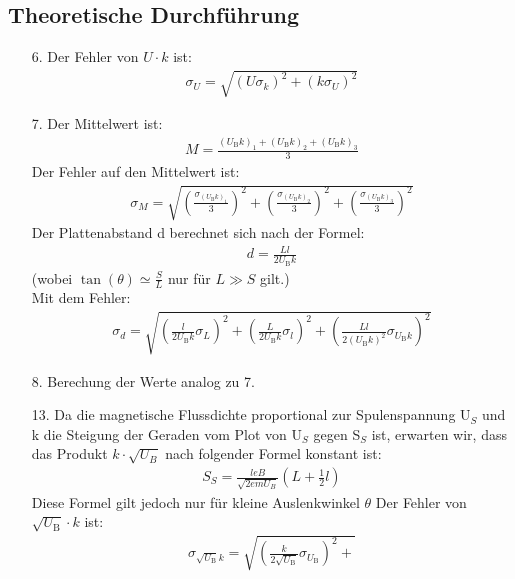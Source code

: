 \documentclass[12pt]{scrartcl}
\begin{document}
\subsection{Theoretische Durchführung}
\begin{itemize}
\item[6.]
Der Fehler von $U \cdot k$ ist:
\begin{align}
\sigma_U = \sqrt{\left(U \sigma_k \right)^2+\left(k \sigma_U\right)^2}
\end{align}
\item[7.]
Der Mittelwert ist:
\begin{align}
M = \frac{(U_{\text{B}}k)_1+
(U_{\text{B}}k)_2+
(U_{\text{B}}k)_3}{3}
\label{eqn:mittel}
\end{align}
Der Fehler auf den Mittelwert ist:
\begin{align}
\sigma_M =\sqrt{
\left(\frac{\sigma_{(U_{\text{B}}k)_1}}{3}\right)^2+ \left(\frac{\sigma_{(U_{\text{B}}k)_2}}{3}\right)^2+
\left(\frac{\sigma_{(U_{\text{B}}k)_3}}{3}\right)^2}
\label{eqn:mittel_sigma}
\end{align}
Der Plattenabstand d berechnet sich nach der Formel:
\begin{align}
d= \frac{L l}{2 U_\text{B} k}
\label{eqn:Plattenabstand}
\end{align}
(wobei $\tan(\theta) \simeq \frac{S}{L}$ nur für $L \gg S$ gilt.)\\
Mit dem Fehler:
\begin{align}
\sigma_d = \sqrt{
\left(\frac{l}{2 U_\text{B} k}\sigma_{L}\right)^2+
\left(\frac{L}{2 U_\text{B} k}\sigma_l\right)^2+
\left(\frac{L l}{2 (U_\text{B} k)^2}\sigma_{U_\text{B} k}\right)^2}
\label{eqn:Plattenabstand_sigma}
\end{align}
\item[8.]
Berechung der Werte analog zu 7.
\item[13.]
Da die magnetische Flussdichte proportional zur Spulenspannung U$_S$ und k die Steigung der Geraden vom Plot von U$_S$ gegen S$_S$ ist, erwarten wir, dass das Produkt $k\cdot\sqrt{U_B}$ nach folgender Formel konstant ist:
\begin{align}
S_S = \frac{leB}{\sqrt{2em U_B}}(L+\frac{1}{2}l)
\label{eqn:AuslenkungSpulenspannung}
\end{align}
Diese Formel gilt jedoch nur für kleine Auslenkwinkel $\theta$
Der Fehler von $\sqrt{U_\text{B}} \cdot k$ ist:
\begin{align}
\sigma_{\sqrt{U_\text{B}}k} = \sqrt{
\left(\frac{k}{2\sqrt{U_\text{B}}}\sigma_{U_\text{B}}\right)^2+
}
\end{align}
\end{itemize}
\end{document}
